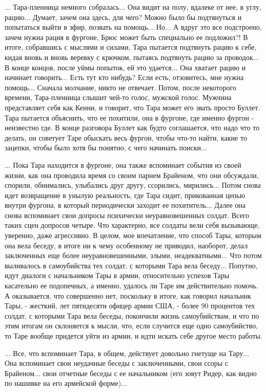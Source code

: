 ... Тара-пленница немного собралась... Она видит на полу, вдалеке от нее, в
углу, рацию... Думает, зачем она здесь, для чего? Можно было бы подтянуться и
попытаться выйти в эфир, позвать на помощь... Но... А вдруг это все подстроено,
зачем нужна рация в фургоне, Брюс может быть специально ее подложил?! В итоге,
собравшись с мыслями и силами, Тара пытается подтянуть рацию к себе, кидая
вновь и вновь веревку с крючком, пытаясь подтянуть рацию за проводок... В конце
концов, после уймы попыток, ей это удается... Она хватает рацию и начинает
говорить... Есть тут кто нибудь? Если есть, отзовитесь, мне нужна помощь...
Сначала молчание, никто не отвечает.  Потом, после некоторого времени,
Тара-пленница слышит чей-то голос, мужской голос. Мужчина представляет себя как
Кенни, и говорит, что Тара может его звать просто Буллет. Тара пытается
объяснить, что ее похитили, она в фургоне, где именно фургон - неизвестно где.
В конце разговора Буллет как будто соглашается, что надо что то делать, он
советует Таре обыскать весь фургон, чтобы что-то найти, какие то зацепки, чтобы
было хотя бы понятно, с чего начинать поиски...

... Пока Тара находится в фургоне, она также вспоминает события из своей жизни,
как она проводила время со своим парнем Брайеном, что они обсуждали, спорили,
обнимались, улыбались друг другу, ссорились, мирились... Потом снова идет
возвращение в унылую реальность, где Тара сидит, прикованная цепью внутри
фургона, в который периодически заходит ее похититель... Далее она снова
вспоминает свои допросы психически неуравновешенных солдат. Всего таких сцен
допросов четыре.  Что характерно, все солдаты вели себя вызывающе, уверенно,
даже агрессивно. В целом, мое впечатление, что способ Тары, которым она вела
беседу, в итоге ни к чему особенному не приводил, наоборот, делал заключенных
еще более неуравновешенными, злыми, неадекватными...  Что потом выливалось в
самоубийства тех солдат, с которыми Тара вела беседу...  Попутно, идут диалоги
с начальником Тары в армии, относительно успехов Тары касательно ее подопечных,
а именно, удалось ли Таре им действительно помочь. А оказывается, что
совершенно нет, поскольку в итоге, как говорил начальник Тары, - жесткий, лет
пятидесяти офицер армии США, - более 90 процентов тех солдат, с которыми Тара
вела беседы, покончили жизнь самоубийствам, и что по этим итогам он склоняется
к мысли, что, если случится еще одно самоубийство, то Таре вообще придется уйти
из армии, и идти искать себе другое место работы.

... Все, что вспоминает Тара, в общем, действует довольно гнетуще на Тару... 
Она вспоминает свои неудачные беседы с заключенными, свои ссоры с Брайеном...
свои отчетные беседы с ее начальником (его зовут Ридер, как видно по нашивке на его армейской форме)...

